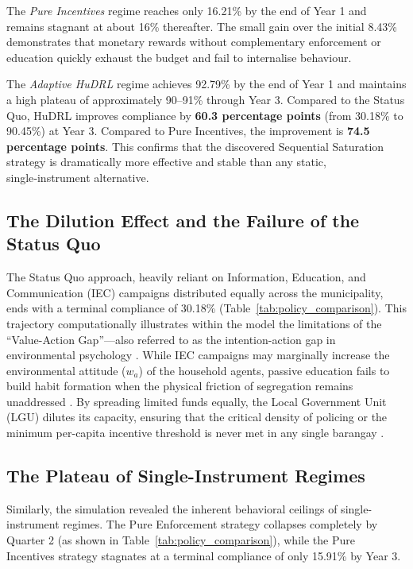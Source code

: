 The \textit{Pure Incentives} regime reaches only 16.21\% by the end of Year 1 and remains stagnant at about 16\% thereafter. The small gain over the initial 8.43\% demonstrates that monetary rewards without complementary enforcement or education quickly exhaust the budget and fail to internalise behaviour.

The \textit{Adaptive HuDRL} regime achieves 92.79\% by the end of Year 1 and maintains a high plateau of approximately 90–91\% through Year 3. Compared to the Status Quo, HuDRL improves compliance by \textbf{60.3 percentage points} (from 30.18\% to 90.45\%) at Year 3. Compared to Pure Incentives, the improvement is \textbf{74.5 percentage points}. This confirms that the discovered Sequential Saturation strategy is dramatically more effective and stable than any static, single‑instrument alternative.


\subsection{The Dilution Effect and the Failure of the Status Quo}
The Status Quo approach, heavily reliant on Information, Education, and Communication (IEC) campaigns distributed equally across the municipality, ends with a terminal compliance of 30.18\% (Table~\ref{tab:policy_comparison}). This trajectory computationally illustrates within the model the limitations of the ``Value-Action Gap''---also referred to as the intention-action gap in environmental psychology \citep{Geiger2021, Liao2024}. While IEC campaigns may marginally increase the environmental attitude ($w_a$) of the household agents, passive education fails to build habit formation when the physical friction of segregation remains unaddressed \citep{Moeini2023, Yazawa2025}. By spreading limited funds equally, the Local Government Unit (LGU) dilutes its capacity, ensuring that the critical density of policing or the minimum per-capita incentive threshold is never met in any single barangay \citep{Alphonso2024}. 

\subsection{The Plateau of Single-Instrument Regimes}
Similarly, the simulation revealed the inherent behavioral ceilings of single-instrument regimes. The Pure Enforcement strategy collapses completely by Quarter 2 (as shown in Table~\ref{tab:policy_comparison}), while the Pure Incentives strategy stagnates at a terminal compliance of only 15.91\% by Year 3. 

